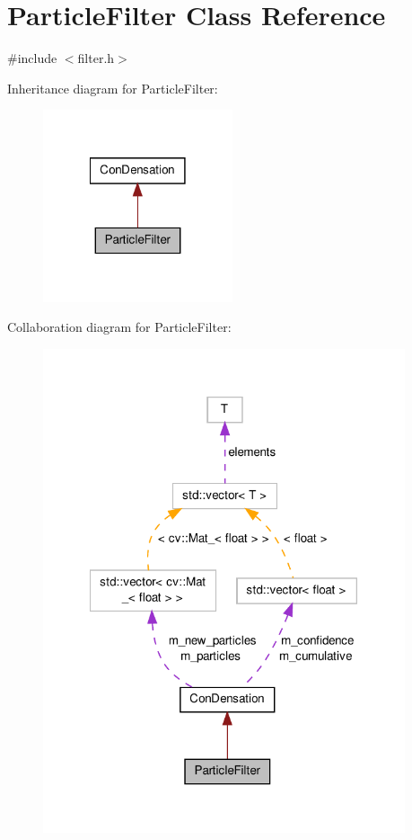 \hypertarget{classParticleFilter}{\section{Particle\-Filter Class Reference}
\label{classParticleFilter}
}


{\ttfamily \#include $<$filter.\-h$>$}



Inheritance diagram for Particle\-Filter\-:
\nopagebreak
\begin{figure}[H]
\begin{center}
\leavevmode
\includegraphics[width=158pt]{classParticleFilter__inherit__graph}
\end{center}
\end{figure}


Collaboration diagram for Particle\-Filter\-:
\nopagebreak
\begin{figure}[H]
\begin{center}
\leavevmode
\includegraphics[width=302pt]{classParticleFilter__coll__graph}
\end{center}
\end{figure}
